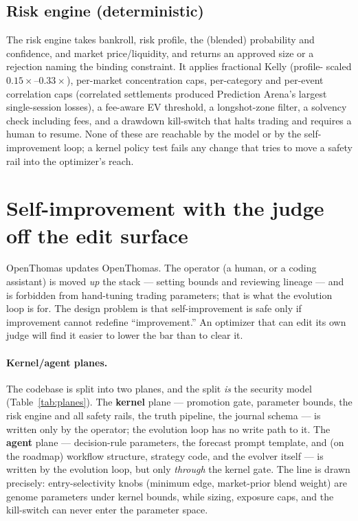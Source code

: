 \documentclass[10pt,twocolumn]{article}
\begin{document}
\subsection{Risk engine (deterministic)}
The risk engine takes bankroll, risk profile, the (blended) probability and
confidence, and market price/liquidity, and returns an approved size or a
rejection naming the binding constraint. It applies fractional Kelly (profile-
scaled $0.15\times$--$0.33\times$), per-market concentration caps, per-category
and per-event correlation caps (correlated settlements produced Prediction
Arena's largest single-session losses), a fee-aware EV threshold, a longshot-zone
filter, a solvency check including fees, and a drawdown kill-switch that halts
trading and requires a human to resume. None of these are reachable by the model
or by the self-improvement loop; a kernel policy test fails any change that tries
to move a safety rail into the optimizer's reach.

\section{Self-improvement with the judge off the edit surface}
\label{sec:rsi}

OpenThomas updates OpenThomas. The operator (a human, or a coding assistant) is
moved \emph{up} the stack --- setting bounds and reviewing lineage --- and is
forbidden from hand-tuning trading parameters; that is what the evolution loop is
for. The design problem is that self-improvement is safe only if improvement
cannot redefine ``improvement.'' An optimizer that can edit its own judge will
find it easier to lower the bar than to clear it.

\paragraph{Kernel/agent planes.} The codebase is split into two planes, and the
split \emph{is} the security model (Table~\ref{tab:planes}). The \textbf{kernel}
plane --- promotion gate, parameter bounds, the risk engine and all safety rails,
the truth pipeline, the journal schema --- is written only by the operator; the
evolution loop has no write path to it. The \textbf{agent} plane --- decision-rule
parameters, the forecast prompt template, and (on the roadmap) workflow
structure, strategy code, and the evolver itself --- is written by the evolution
loop, but only \emph{through} the kernel gate. The line is drawn precisely:
entry-selectivity knobs (minimum edge, market-prior blend weight) are genome
parameters under kernel bounds, while sizing, exposure caps, and the kill-switch
can never enter the parameter space.
\end{document}
